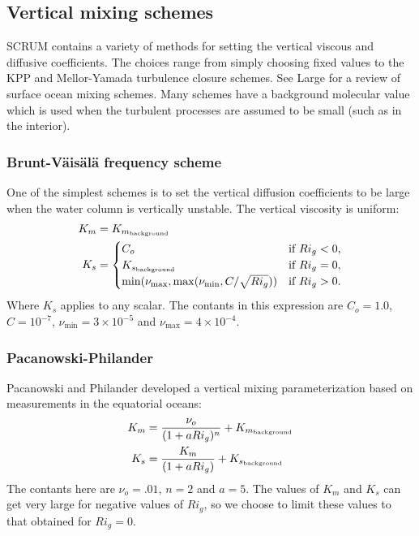 \subsection{Vertical mixing schemes}
\label{Vmix}
SCRUM contains a variety of methods for setting the vertical viscous and
diffusive coefficients. The choices range from simply choosing fixed
values to the KPP and Mellor-Yamada turbulence closure schemes.
See Large \cite{Large98} for a review of surface ocean mixing schemes.
Many schemes have a background molecular value which is used when the
turbulent processes are assumed to be small (such as in the interior).

\subsubsection{Brunt-V\"ais\"al\"a frequency scheme}
One of the simplest schemes is to set the vertical diffusion
coefficients to be large when the water column is vertically unstable.
The vertical viscosity is uniform:
\begin{align}
   K_m &= K_{m_{\rm background}} \\
   K_s &=
   \begin{cases}
     C_o &                     \text{if $Ri_g < 0$,} \\
     K_{s_{\rm background}} & \text{if $Ri_g = 0$,} \\
     \min ( \nu_{\max}, \max ( \nu_{\min}, C / \sqrt{Ri_g} )) &
			       \text{if $Ri_g > 0$}.
   \end{cases}
\end{align}
Where $K_s$ applies to any scalar. The contants in this expression are
$C_o = 1.0$, $C = 10^{-7}$, $\nu_{\min} = 3 \times 10^{-5}$ and
$\nu_{\max} = 4 \times 10^{-4}$.

\subsubsection{Pacanowski-Philander}
Pacanowski and Philander \cite{Pacanowski81} developed a vertical
mixing parameterization based on measurements in the equatorial oceans:
\begin{align}
   K_m &= {\nu_o \over (1 + a Ri_g)^n} + K_{m_{\rm background}} \\
   K_s &= {K_m \over (1 + a Ri_g)} + K_{s_{\rm background}}
\end{align}
The contants here are $\nu_o = .01$, $n = 2$ and $a = 5$. The values of
$K_m$ and $K_s$ can get very large for negative values of $Ri_g$, so we
choose to limit these values to that obtained for $Ri_g = 0$.

